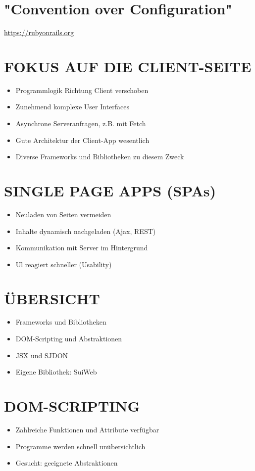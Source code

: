 \documentclass[10pt]{article}
\begin{document}
\section*{"Convention over Configuration"}
\href{https://rubyonrails.org}{https://rubyonrails.org}

\section*{FOKUS AUF DIE CLIENT-SEITE}
\begin{itemize}
  \item Programmlogik Richtung Client verschoben
  \item Zunehmend komplexe User Interfaces
  \item Asynchrone Serveranfragen, z.B. mit Fetch
  \item Gute Architektur der Client-App wesentlich
  \item Diverse Frameworks und Bibliotheken zu diesem Zweck
\end{itemize}

\section*{SINGLE PAGE APPS (SPAs)}
\begin{itemize}
  \item Neuladen von Seiten vermeiden
  \item Inhalte dynamisch nachgeladen (Ajax, REST)
  \item Kommunikation mit Server im Hintergrund
  \item Ul reagiert schneller (Usability)
\end{itemize}

\section*{ÜBERSICHT}
\begin{itemize}
  \item Frameworks und Bibliotheken
  \item DOM-Scripting und Abstraktionen
  \item JSX und SJDON
  \item Eigene Bibliothek: SuiWeb
\end{itemize}

\section*{DOM-SCRIPTING}
\begin{itemize}
  \item Zahlreiche Funktionen und Attribute verfügbar
  \item Programme werden schnell unübersichtlich
  \item Gesucht: geeignete Abstraktionen
\end{itemize}
\end{document}

